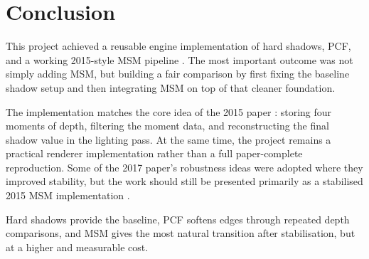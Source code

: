 \section{Conclusion}

This project achieved a reusable engine implementation of hard shadows, PCF, and a working 2015-style MSM pipeline \cite{peters2015msm}. The most important outcome was not simply adding MSM, but building a fair comparison by first fixing the baseline shadow setup and then integrating MSM on top of that cleaner foundation.

The implementation matches the core idea of the 2015 paper \cite{peters2015msm}: storing four moments of depth, filtering the moment data, and reconstructing the final shadow value in the lighting pass. At the same time, the project remains a practical renderer implementation rather than a full paper-complete reproduction. Some of the 2017 paper's robustness ideas \cite{peters2017improved} were adopted where they improved stability, but the work should still be presented primarily as a stabilised 2015 MSM implementation \cite{peters2015msm}.

Hard shadows provide the baseline, PCF softens edges through repeated depth comparisons, and MSM gives the most natural transition after stabilisation, but at a higher and measurable cost.
